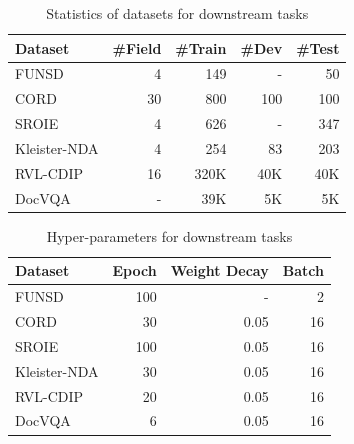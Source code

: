 \documentclass[11pt]{article}
\begin{document}
\begin{table}[t]
\centering
\small
\begin{tabular}{lrrrr}
\toprule
\textbf{Dataset} & \textbf{\#Field} & \textbf{\#Train} & \textbf{\#Dev} & \textbf{\#Test} \\
\midrule
FUNSD & 4 & 149 & - & 50 \\
CORD & 30 & 800 & 100 & 100 \\
SROIE & 4 & 626 & - & 347 \\ 
Kleister-NDA & 4 & 254 & 83 & 203 \\
RVL-CDIP & 16 & 320K & 40K & 40K \\
DocVQA & - & 39K & 5K & 5K \\ 
\bottomrule
\end{tabular}
\caption{Statistics of datasets for downstream tasks}
\label{tab:statistics_of_fine_tuning_datasets}
\end{table}

\begin{table}[t]
    \centering
    \small
    \begin{tabular}{lrrr}
    \toprule
    \textbf{Dataset} & \textbf{Epoch} & \textbf{Weight Decay} & \textbf{Batch} \\
    \midrule
    FUNSD & 100 & - & 2 \\
    CORD & 30 & 0.05 & 16 \\
    SROIE & 100 & 0.05 & 16 \\ 
    Kleister-NDA & 30 & 0.05 & 16 \\
    RVL-CDIP & 20 & 0.05 & 16 \\
    DocVQA & 6 & 0.05 & 16 \\ 
    \bottomrule
    \end{tabular}
    \caption{Hyper-parameters for downstream tasks}
    \label{tab:finetune_hyper_parameter}
\end{table}
\end{document}
